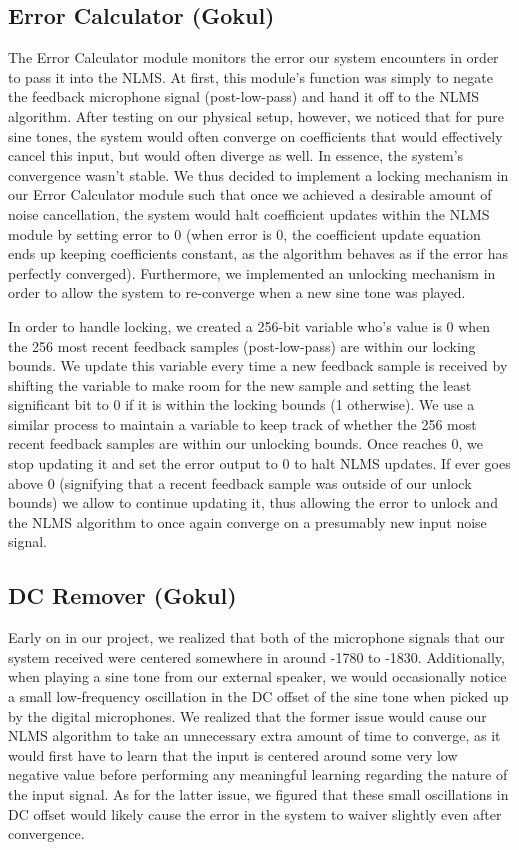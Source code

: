 \documentclass{fpgairpods}
\begin{document}
\subsection{Error Calculator (Gokul)}
The Error Calculator module monitors the error our system encounters in order to pass it into the NLMS. At first, this module's function was simply to negate the feedback microphone signal (post-low-pass) and hand it off to the NLMS algorithm. After testing on our physical setup, however, we noticed that for pure sine tones, the system would often converge on coefficients that would effectively cancel this input, but would often diverge as well. In essence, the system's convergence wasn't stable. We thus decided to implement a locking mechanism in our Error Calculator module such that once we achieved a desirable amount of noise cancellation, the system would halt coefficient updates within the NLMS module by setting error to 0 (when error is 0, the coefficient update equation ends up keeping coefficients constant, as the algorithm behaves as if the error has perfectly converged). Furthermore, we implemented an unlocking mechanism in order to allow the system to re-converge when a new sine tone was played.

In order to handle locking, we created a 256-bit variable  who's value is 0 when the 256 most recent feedback samples (post-low-pass) are within our locking bounds. We update this variable every time a new feedback sample is received by shifting the variable to make room for the new sample and setting the least significant bit to 0 if it is within the locking bounds (1 otherwise). We use a similar process to maintain a variable  to keep track of whether the 256 most recent feedback samples are within our unlocking bounds. Once  reaches 0, we stop updating it and set the error output to 0 to halt NLMS updates. If  ever goes above 0 (signifying that a recent feedback sample was outside of our unlock bounds) we allow  to continue updating it, thus allowing the error to unlock and the NLMS algorithm to once again converge on a presumably new input noise signal.


\subsection{DC Remover (Gokul)}
Early on in our project, we realized that both of the microphone signals that our system received were centered somewhere in around -1780 to -1830. Additionally, when playing a sine tone from our external speaker, we would occasionally notice a small low-frequency oscillation in the DC offset of the sine tone when picked up by the digital microphones. We realized that the former issue would cause our NLMS algorithm to take an unnecessary extra amount of time to converge, as it would first have to learn that the input is centered around some very low negative value before performing any meaningful learning regarding the nature of the input signal. As for the latter issue, we figured that these small oscillations in DC offset would likely cause the error in the system to waiver slightly even after convergence.
\end{document}
